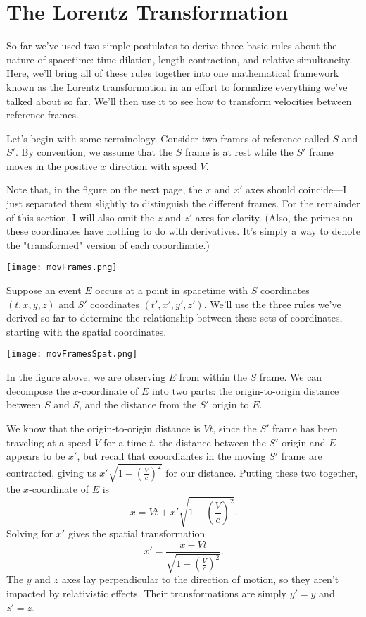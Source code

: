 \documentclass[../p023main.tex]{subfiles}
\begin{document}
\section{The Lorentz Transformation}
So far we've used two simple postulates to derive three basic rules about the nature of spacetime: time dilation, length contraction, and relative simultaneity.
Here, we'll bring all of these rules together into one mathematical framework known as the Lorentz transformation in an effort to formalize everything we've talked about so far.
We'll then use it to see how to transform velocities between reference frames.

Let's begin with some terminology.
Consider two frames of reference called $S$ and $S'$.
By convention, we assume that the $S$ frame is at rest while the $S'$ frame moves in the positive $x$ direction with speed $V$.

Note that, in the figure on the next page, the $x$ and $x'$ axes should coincide---I just separated them slightly to distinguish the different frames.
For the remainder of this section, I will also omit the $z$ and $z'$ axes for clarity.
(Also, the primes on these coordinates have nothing to do with derivatives.
It's simply a way to denote the "transformed" version of each cooordinate.)
\begin{center}
    \texttt{[image: movFrames.png]}
\end{center}
Suppose an event $E$ occurs at a point in spacetime with $S$ coordinates $(t, x, y, z)$ and $S'$ coordinates $(t', x', y', z')$.
We'll use the three rules we've derived so far to determine the relationship between these sets of coordinates, starting with the spatial coordinates.
\begin{center}
    \texttt{[image: movFramesSpat.png]}
\end{center}
In the figure above, we are observing $E$ from within the $S$ frame.
We can decompose the $x$-coordinate of $E$ into two parts: the origin-to-origin distance between $S$ and $S$, and the distance from the $S'$ origin to $E$.

We know that the origin-to-origin distance is $Vt$, since the $S'$ frame has been traveling at a speed $V$ for a time $t$.
the distance between the $S'$ origin and $E$ appears to be $x'$, but recall that cooordiantes in the moving $S'$ frame are contracted, giving us $x' \sqrt{1 - \left( \frac{V}{c} \right)^2}$ for our distance.
Putting these two together, the $x$-coordinate of $E$ is
\[ x = Vt + x'\sqrt{1 - \left( \frac{V}{c} \right)^2}. \]
Solving for $x'$ gives the spatial transformation
\[ x' = \frac{x - Vt}{\sqrt{1 - \left( \frac{V}{c} \right)^2}}. \]
The $y$ and $z$ axes lay perpendicular to the direction of motion, so they aren't impacted by relativistic effects.
Their transformations are simply $y' = y$ and $z' = z$.
\end{document}
